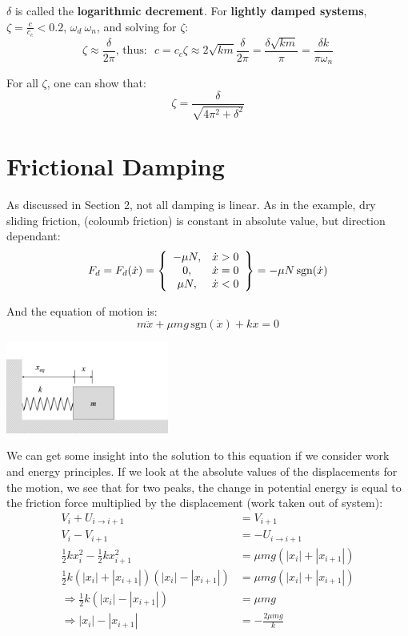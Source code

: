 \documentclass[12pt,letterpaper,twoside]{report}
\begin{document}
$\delta$ is called the \textbf{logarithmic decrement}. For \textbf{lightly damped systems}, $\zeta = \frac{c}{c_c} < 0.2$, $\omega_d ~ \omega_n$, and solving for $\zeta$:
\[
\zeta \approx \frac{\delta}{2 \pi} \text{,  thus:    } \, \, c = c_c\zeta \approx 2 \sqrt{km} \frac{\delta}{2 \pi} = \frac{\delta \sqrt{km}}{\pi} = \frac{\delta k}{\pi \omega_n}
\]

For all $\zeta$, one can show that: 
\[
\zeta = \frac{\delta}{\sqrt{4 \pi^2 + \delta^2}}
\]

\vspace*{16\baselineskip}

\section{Frictional Damping}
As discussed in Section 2, not all damping is linear. As in the example, dry sliding friction, (coloumb friction) is constant in absolute value, but direction dependant:
\[
F_d = F_d(\dot{x}) = \left\{
\begin{array}{c c}
 -\mu N, & \dot{x} > 0\\
 0, & \dot{x} = 0\\
 \mu N , & \dot{x} < 0\\
 \end{array}
 \right\} = -\mu N \, \text{sgn}(\dot{x})
 \]
 
And the equation of motion is:
\[
m \ddot{x} + \mu m g \, \text{sgn} (\dot{x}) + kx = 0
\]

\includegraphics[trim={1cm 1cm 6cm 3cm},clip,width=0.4\textwidth, left]{Slide95}

We can get some insight into the solution to this equation if we consider work and energy principles. If we look at the absolute values of the displacements for the motion, we see that for two peaks, the change in potential energy is equal to the friction force multiplied by the displacement (work taken out of system):
\begin{align*}
V_i + U_{i \rightarrow i+1} &= V_{i+1} \\
V_i - V_{i+1} &= - U_{i \rightarrow i+1} \\
\frac{1}{2}k x_i^2 - \frac{1}{2} k x_{i+1}^2 &= \mu mg\left( |x_i| + |x_{i+1}| \right) \\
 \frac{1}{2} k \left( |x_i| + |x_{i+1}| \right)\left( |x_i| - |x_{i+1}| \right) &= \mu mg\left( |x_i| + |x_{i+1}| \right) \\
 \Rightarrow \frac{1}{2} k \left( |x_i| - |x_{i+1}| \right) &= \mu mg\\ \Rightarrow  |x_i| - |x_{i+1}| &= - \frac{2 \mu mg}{k}\\
\end{align*}
\end{document}

